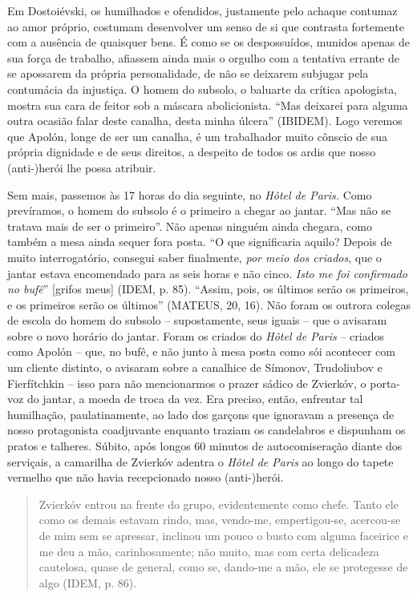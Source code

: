 Em Dostoiévski, os humilhados e ofendidos, justamente pelo achaque
contumaz ao amor próprio, costumam desenvolver um senso de si que
contrasta fortemente com a ausência de quaisquer bens. É como se os
despossuídos, munidos apenas de sua força de trabalho, afiassem ainda
mais o orgulho com a tentativa errante de se apossarem da própria
personalidade, de não se deixarem subjugar pela contumácia da injustiça.
O homem do subsolo, o baluarte da crítica apologista, mostra sua cara de
feitor sob a máscara abolicionista. ``Mas deixarei para alguma outra
ocasião falar deste canalha, desta minha úlcera'' (IBIDEM). Logo veremos
que Apolón, longe de ser um canalha, é um trabalhador muito cônscio de
sua própria dignidade e de seus direitos, a despeito de todos os ardis
que nosso (anti-)herói lhe possa atribuir.

Sem mais, passemos às 17 horas do dia seguinte, no \emph{Hôtel de
Paris.} Como prevíramos, o homem do subsolo é o primeiro a chegar ao
jantar. ``Mas não se tratava mais de ser o primeiro''. Não apenas
ninguém ainda chegara, como também a mesa ainda sequer fora posta. ``O
que significaria aquilo? Depois de muito interrogatório, consegui saber
finalmente, \emph{por meio dos criados}, que o jantar estava encomendado
para as seis horas e não cinco. \emph{Isto me foi confirmado no bufê}''
{[}grifos meus{]} (IDEM, p. 85). ``Assim, pois, os últimos serão os
primeiros, e os primeiros serão os últimos'' (MATEUS, 20, 16). Não foram
os outrora colegas de escola do homem do subsolo -- supostamente, seus
iguais -- que o avisaram sobre o novo horário do jantar. Foram os
criados do \emph{Hôtel de Paris} -- criados como Apolón -- que, no bufê,
e não junto à mesa posta como sói acontecer com um cliente distinto, o
avisaram sobre a canalhice de Símonov, Trudoliubov e Fierfítchkin --
isso para não mencionarmos o prazer sádico de Zvierkóv, o porta-voz do
jantar, a moeda de troca da vez. Era preciso, então, enfrentar tal
humilhação, paulatinamente, ao lado dos garçons que ignoravam a presença
de nosso protagonista coadjuvante enquanto traziam os candelabros e
dispunham os pratos e talheres. Súbito, após longos 60 minutos de
autocomiseração diante dos serviçais, a camarilha de Zvierkóv adentra o
\emph{Hôtel de Paris} ao longo do tapete vermelho que não havia
recepcionado nosso (anti-)herói.

\begin{quote}
Zvierkóv entrou na frente do grupo, evidentemente como chefe. Tanto ele
como os demais estavam rindo, mas, vendo-me, empertigou-se, acercou-se
de mim sem se apressar, inclinou um pouco o busto com alguma faceirice e
me deu a mão, carinhosamente; não muito, mas com certa delicadeza
cautelosa, quase de general, como se, dando-me a mão, ele se protegesse
de algo (IDEM, p. 86).
\end{quote}


